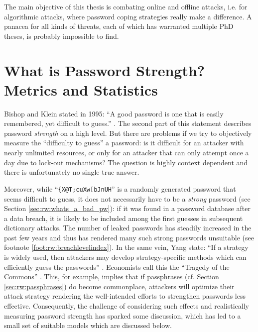 The main objective of this thesis is combating online and offline attacks, i.e. for algorithmic attacks, where password coping strategies really make a difference. A panacea for all kinds of threats, each of which has warranted multiple PhD theses, is probably impossible to find. 



\section{What is Password Strength? Metrics and Statistics}\label{sec:rw:pw_strength_metrics}
Bishop and Klein stated in 1995: ``A good password is one that is easily remembered, yet difficult to guess.'' \cite[p. 231]{Bishop1995ProactivePasswordChecking}. The second part of this statement describes password \textit{strength} on a high level. But there are problems if we try to objectively measure the ``difficulty to guess'' a password: is it difficult for an attacker with nearly unlimited resources, or only for an attacker that can only attempt once a day due to lock-out mechanisms? The question is highly context dependent and there is unfortunately no single true answer. 

Moreover, while ``\texttt{\{X@T;cuXw[bJnUH}'' is a randomly generated password that seems difficult to guess, it does not necessarily have to be a \textit{strong} password (see Section \ref{sec:rw:whats_a_bad_pw}): if it was found in a password database after a data breach, it is likely to be included among the first guesses in subsequent dictionary attacks. The number of leaked passwords has steadily increased in the past few years and thus has rendered many such strong passwords unsuitable (see footnote \ref{foot:rw:breachlevelindex}). In the same vein, Yang \etal state: ``If a strategy is widely used, then attackers may develop strategy-specific methods which can efficiently guess the passwords'' \cite{Yang2016MnemonicSentenceBased}. Economists call this the ``Tragedy of the Commons'' \cite{Hardin1968TragedyCommons}. This, for example, implies that if passphrases (cf. Section \ref{sec:rw:passphrases}) do become commonplace, attackers will optimize their attack strategy rendering the well-intended efforts to strengthen passwords less effective. Consequently, the challenge of considering such effects and realistically measuring password strength has sparked some discussion, which has led to a small set of suitable models which are discussed below.



